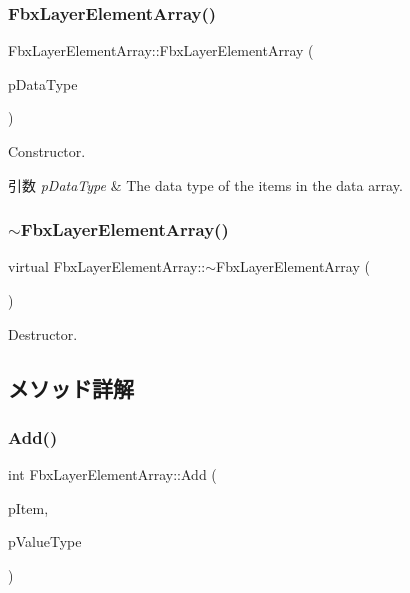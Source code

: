 \subsubsection{\texorpdfstring{Fbx\+Layer\+Element\+Array()}{FbxLayerElementArray()}}
{\footnotesize\ttfamily Fbx\+Layer\+Element\+Array\+::\+Fbx\+Layer\+Element\+Array (\begin{DoxyParamCaption}\item[{\hyperlink{fbxpropertytypes_8h_a73913a5ddfb20e57c6f25e9e6784bd92}{E\+Fbx\+Type}}]{p\+Data\+Type }\end{DoxyParamCaption})}

Constructor. 
\begin{DoxyParams}{引数}
{\em p\+Data\+Type} & The data type of the items in the data array. \\
\hline
\end{DoxyParams}
\mbox{\label{class_fbx_layer_element_array_abee3841f66f7d668f113c728a93dd26d}} 
\subsubsection{\texorpdfstring{$\sim$\+Fbx\+Layer\+Element\+Array()}{~FbxLayerElementArray()}}
{\footnotesize\ttfamily virtual Fbx\+Layer\+Element\+Array\+::$\sim$\+Fbx\+Layer\+Element\+Array (\begin{DoxyParamCaption}{ }\end{DoxyParamCaption})\hspace{0.3cm}{\ttfamily [virtual]}}



Destructor. 



\subsection{メソッド詳解}
\mbox{\label{class_fbx_layer_element_array_a828c096f6e750eec65f59a86d0204e12}} 
\subsubsection{\texorpdfstring{Add()}{Add()}\hspace{0.1cm}{\footnotesize\ttfamily [1/2]}}
{\footnotesize\ttfamily int Fbx\+Layer\+Element\+Array\+::\+Add (\begin{DoxyParamCaption}\item[{const void $\ast$}]{p\+Item,  }\item[{\hyperlink{fbxpropertytypes_8h_a73913a5ddfb20e57c6f25e9e6784bd92}{E\+Fbx\+Type}}]{p\+Value\+Type }\end{DoxyParamCaption})}

